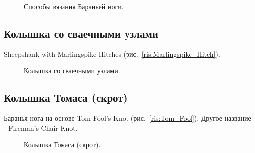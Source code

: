 \begin{figure}[H]\centering
	\caption{Способы вязания Бараньей ноги.}\label{ris:Sheepshank_Knot_metod}
\end{figure}

\subsection{Колышка со сваечными узлами}

Sheepshank with Marlingspike Hitches (рис.~\ref{ris:Marlingspike_Hitch}).

\begin{figure}[H]\centering
	\begin{minipage}{1\linewidth}
		\begin{center}
			\tcbox[enhanced jigsaw,colframe=black,opacityframe=0.5,opacityback=0.5]
			{\centering{}}
		\end{center}
	\end{minipage}
\caption{Колышка со сваечными узлами.}
\label{ris:Sheepshank_with_Marlingspike_Hitches}
\end{figure}

\subsection{Колышка Томаса (скрот)}

Баранья нога на основе Tom Fool’s Knot (рис.~\ref{ris:Tom_Fool}). Другое название - Fireman’s Chair Knot.

\begin{figure}[H]\centering
	\subfloat[Завязывание]{\label{ris:Sheepshank_based_on_the_Tom_Fools_Knot_1}
	\tcbox[enhanced jigsaw,colframe=black,opacityframe=0.5,opacityback=0.5]
		{\centering
			}
		}
\end{figure}

\begin{figure}[H]\centering
	\subfloat[Результат]{\label{ris:Sheepshank_based_on_the_Tom_Fools_Knot_2}
	\tcbox[enhanced jigsaw,colframe=black,opacityframe=0.5,opacityback=0.5]
		{\centering
			}
		}
	\caption{Колышка Томаса (скрот).}\label{ris:Sheepshank_based_on_the_Tom_Fools_Knot}
\end{figure}

